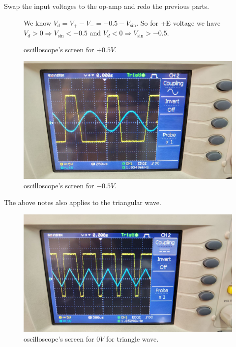 \documentclass[11pt]{article}
\newcommand{\PicScale}{0.2}
\begin{document}
\begin{question}
\begin{subquestion}{Swap the input voltages to the op-amp and redo the previous parts.}
{\begin{figure}[H]
                \caption{oscilloscope's screen for $+0.5V$.}
                We know $V_d = V_+ - V_- = -0.5 - V_{\sin}$. So for +E voltage we have $V_d > 0 \Rightarrow V_{\sin} < -0.5$ and $V_d < 0 \Rightarrow V_{\sin} > -0.5$.
            \end{figure}
            \begin{figure}[H]
                \centering
                \includegraphics[scale=\PicScale,angle=0]{Fig/13.jpeg}
                \caption{oscilloscope's screen for $-0.5V$.}
            \end{figure}
            The above notes also applies to the triangular wave.
            \begin{figure}[H]
                \centering
                \includegraphics[scale=\PicScale,angle=0]{Fig/53.jpeg}
                \caption{oscilloscope's screen for $0V$ for triangle wave.}
            \end{figure}
            \begin{figure}[H]
                \centering

\end{figure}}
\end{subquestion}
\end{question}
\end{document}
